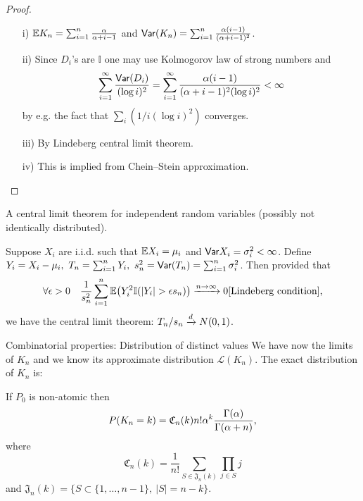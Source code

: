 \begin{proof}
\begin{enumerate}
    \item[i)] $\mathbb{E} K_n = \sum_{i=1}^n \frac{\alpha}{\alpha+i-1} $ and $ \mathsf{Var}(K_n) = \sum_{i=1}^n\frac{\alpha(i-1)}{(\alpha + i -1)^2}$.
    \item[ii)] Since $D_i$'s are $\mathbb{I}$ one may use Kolmogorov law of strong numbers and 
    $$
    \sum_{i=1}^\infty \frac{\mathsf{Var} (D_i)}{ (\log i)^2 }= \sum_{i=1}^\infty \frac{\alpha(i-1)}{(\alpha +i-1)^2 (\log i)^2}<\infty$$
    by e.g. the fact that $\sum_i (1/i(\log i)^2)$ converges.
    \item[iii)]By Lindeberg central limit theorem.
    \item[iv)] This is implied from Chein--Stein approximation. %
\end{enumerate}
\end{proof}


A central limit theorem for independent random variables (possibly not identically distributed).

\begin{theorem}
Suppose $X_i$ are i.i.d. such that $\mathbb{E} X_i = \mu_i$ and $\mathsf{Var} X_i = \sigma_i^2 <\infty$. Define $Y_i = X_i - \mu_i,\ T_n = \sum_{i=1}^n Y_i,\ s_n^2 = \mathsf{Var} (T_n) = \sum_{i=1}^n\sigma_i^2$. Then provided that
\begin{equation*}
    \forall \epsilon > 0\quad \frac{1}{s_n^2}\sum_{i=1}^n\E \big(Y_i^2 \mathbb{I}(|Y_i|>\epsilon s_n) \big)\xrightarrow{n\rightarrow \infty} 0 \text{[Lindeberg condition],}
\end{equation*}
we have the central limit theorem: $T_n/s_n \xrightarrow{\small{d}}N(0,1)$.
\end{theorem}





{Combinatorial properties: Distribution of distinct values}
	We have now the limits of $K_n$ and we know its approximate distribution $\mathcal{L}(K_n)$. The \alert{exact distribution of $K_n$} is:
\begin{proposition}[Distribution of $K_n$]
If $P_0$ is non-atomic then 
\begin{equation}\label{distr_of_Kn}
    P(K_n=k) = \mathfrak{C}_n(k) n!\alpha ^k \frac{\Gamma(\alpha)}{\Gamma(\alpha+n)},
\end{equation}
where 
\begin{equation}\label{mathfrakC_def}
\mathfrak{C}_n(k)=\frac{1}{n!}\sum_{S\in\mathfrak{J}_n(k)} \prod_{j\in S}j    
\end{equation}
and $\mathfrak{J}_n(k)=\{ S\subset \{ 1,\ldots,n-1\},\ |S|=n-k \}$.
\end{proposition}


